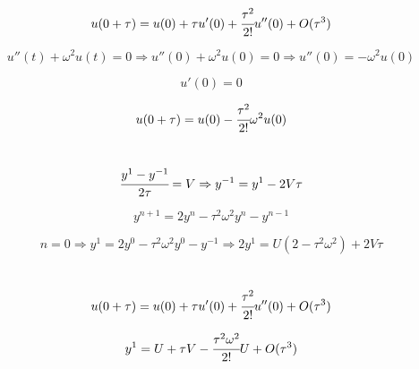 \documentclass[12pt]{article}
\begin{document}
	\section{}
	\begin{equation*}
		u(0 + \tau) = u(0) + \tau u'(0) + \cfrac{\tau^2}{2!}u''(0) + O(\tau^3)
	\end{equation*}

	\begin{equation*}
		u''(t) + {\omega}^2u(t) = 0
		\Rightarrow
		u''(0) + {\omega}^2u(0) = 0
		\Rightarrow
		u''(0) =  -{\omega}^2u(0)
	\end{equation*}

	\begin{equation*}
		u'(0) = 0
	\end{equation*}

	\begin{equation*}
		u(0 + \tau) = u(0) - \cfrac{\tau^2}{2!}{\omega}^2u(0)
	\end{equation*}

	\section{}

	\begin{equation*}
		\cfrac{y^{1}  - y^{-1}}{2\tau} = V
		\Rightarrow
		y^{-1} = y^{1} - 2V\tau
	\end{equation*}

	\begin{equation*}
		y^{n + 1} = 2y^{n} - \tau^2\omega^2y^{n} - y^{n - 1}
	\end{equation*}

	\begin{equation*}
		n = 0 \Rightarrow y^{1} = 2y^{0} - \tau^2\omega^2y^{0} - y^{-1}
		\Rightarrow
		2y^{1} = U(2 - \tau^2\omega^2) + 2V\tau
	\end{equation*}

	\section{}
	\begin{equation*}
		u(0 + \tau) = u(0) + \tau u'(0) + \cfrac{\tau^2}{2!}u''(0) + O(\tau^3)
	\end{equation*}

	\begin{equation*}
		y^{1} = U + \tau V - \cfrac{\tau^2\omega^2}{2!}U + O(\tau^3)
	\end{equation*}
\end{document}
